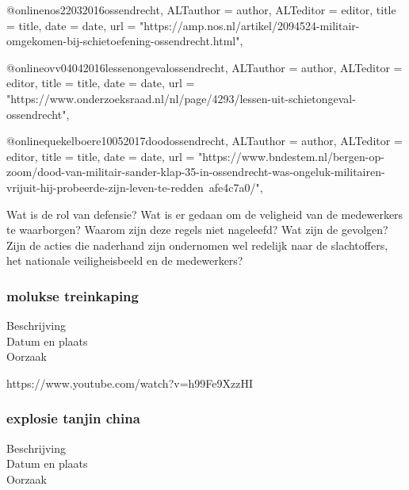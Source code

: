 {{{{{{@online{nos22032016ossendrecht,	ALTauthor = {author},	ALTeditor = {editor},	title = {title},	date = {date},	url = {"https://amp.nos.nl/artikel/2094524-militair-omgekomen-bij-schietoefening-ossendrecht.html"},}

@online{ovv04042016lessenongevalossendrecht,	ALTauthor = {author},	ALTeditor = {editor},	title = {title},	date = {date},	url = {"https://www.onderzoeksraad.nl/nl/page/4293/lessen-uit-schietongeval-ossendrecht"},}

@online{quekelboere10052017doodossendrecht,	ALTauthor = {author},	ALTeditor = {editor},	title = {title},	date = {date},	url = {"https://www.bndestem.nl/bergen-op-zoom/dood-van-militair-sander-klap-35-in-ossendrecht-was-ongeluk-militairen-vrijuit-hij-probeerde-zijn-leven-te-redden~afe4c7a0/"},}


Wat is de rol van defensie?
Wat is er gedaan om de veligheid van de medewerkers te waarborgen?
Waarom zijn deze regels niet nageleefd?
Wat zijn de gevolgen?
Zijn de acties die naderhand zijn ondernomen wel redelijk naar de slachtoffers, het nationale veiligheisbeeld en de medewerkers?



\subsubsection{molukse treinkaping }

\begin{description}
	\item[Beschrijving]
	\item[Datum en plaats] 
	\item[Oorzaak]
\end{description}
https://www.youtube.com/watch?v=h99Fe9XzzHI 
\cite{molukseTreinkaping}
\subsubsection{explosie tanjin china }

\begin{description}
	\item[Beschrijving]
	\item[Datum en plaats] 
	\item[Oorzaak]
\end{description}

}}}}}}
